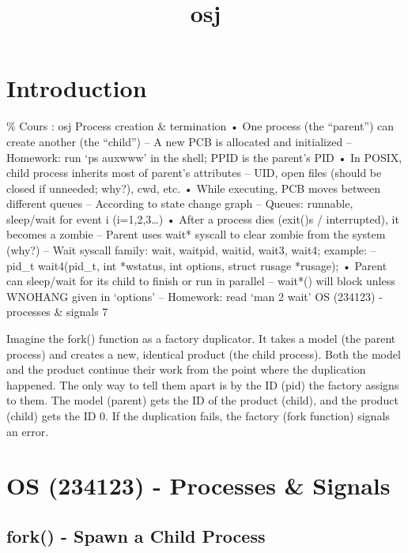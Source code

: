 \documentclass[12pt]{report}
\title{osj}
\author{}
\begin{document}
\maketitle
\tableofcontents
\newpage

\section{Introduction}
\% Cours : osj
Process creation \& termination
• One process (the “parent”) can create another (the “child”)
– A new PCB is allocated and initialized
– Homework: run ‘ps auxwww’ in the shell; PPID is the parent’s PID
• In POSIX, child process inherits most of parent’s attributes
– UID, open files (should be closed if unneeded; why?), cwd, etc.
• While executing, PCB moves between different queues
– According to state change graph 
– Queues: runnable, sleep/wait for event i (i=1,2,3…)
• After a process dies (exit()s / interrupted), it becomes a zombie
– Parent uses wait* syscall to clear zombie from the system (why?)
– Wait syscall family: wait, waitpid, waitid, wait3, wait4; example:
– pid\_t wait4(pid\_t, int *wstatus, int options, struct rusage *rusage); 
• Parent can sleep/wait for its child to finish or run in parallel
– wait*() will block unless WNOHANG given in ‘options’
– Homework: read ‘man 2 wait’
OS (234123) - processes \& signals
7

\begin{tcolorbox}[
  colback=blue!10,
  colframe=blue,
  title={\fontfamily{lmr}\selectfont \faComment Vulgarisation simple},
  fonttitle=\bfseries,
  fontupper=\fontfamily{lmr}\selectfont,
  boxrule=1pt,
  sharp corners,
]
Imagine the fork() function as a factory duplicator. It takes a model (the parent process) and creates a new, identical product (the child process). Both the model and the product continue their work from the point where the duplication happened. The only way to tell them apart is by the ID (pid) the factory assigns to them. The model (parent) gets the ID of the product (child), and the product (child) gets the ID 0. If the duplication fails, the factory (fork function) signals an error.
\end{tcolorbox}
\section{OS (234123) - Processes \& Signals}

\subsection{fork() - Spawn a Child Process}
\end{document}

